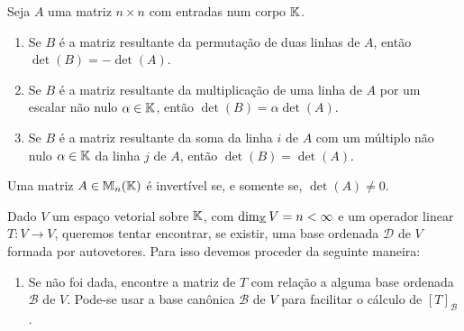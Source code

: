 \documentclass{beamer}
\begin{document}
    \begin{frame}
        \begin{proposicao}
            Seja $A$ uma matriz $n \times n$ \pause com entradas num corpo $\mathbb{K}$.\pause
            \begin{enumerate}[label={\roman*})]
                \item Se $B$ é a matriz resultante da permutação de duas linhas de $A$, \pause então $\det (B) = -\det (A)$.\pause


                \vspace*{1cm}

                \item Se $B$ é a matriz resultante da multiplicação de uma linha de $A$ \pause por um escalar não nulo
                    $\alpha \in \mathbb{K}$, \pause então $\det(B) = \alpha\det(A)$.\pause

                \vspace*{1cm}

                \item Se $B$ é a matriz resultante da soma da linha $i$ de $A$ \pause com um múltiplo não nulo \pause $\alpha \in \mathbb{K}$
                    da linha $j$ de $A$, \pause então $\det(B) = \det(A)$.
            \end{enumerate}
        \end{proposicao}
    \end{frame}

    \begin{frame}
        \begin{teorema}
            Uma matriz $A \in \mathbb{M}_n(\mathbb{K})$ \pause é invertível se, \pause e somente se, $\det(A) \ne 0$.
        \end{teorema}
    \end{frame}

    \begin{frame}
        Dado $V$ um espaço vetorial sobre $\mathbb{K}$, \pause com $\dim_{\mathbb{K}} V = n < \infty$ \pause e um operador linear
        $T \colon V \to V$, \pause queremos tentar encontrar, se existir, \pause uma base ordenada $\mathcal{D}$ de $V$ \pause
        formada por autovetores. \pause Para isso devemos proceder da seguinte maneira:\pause
        \begin{enumerate}[label={\arabic*})]
            \item Se não foi dada, \pause encontre a matriz de $T$ com relação a alguma base ordenada $\mathcal{B}$ de $V$. \pause
                Pode-se usar a base canônica $\mathcal{B}$ \pause de $V$ para facilitar o cálculo de $[T]_\mathcal{B}$.
            \seti
        \end{enumerate}
    \end{frame}
\end{document}
